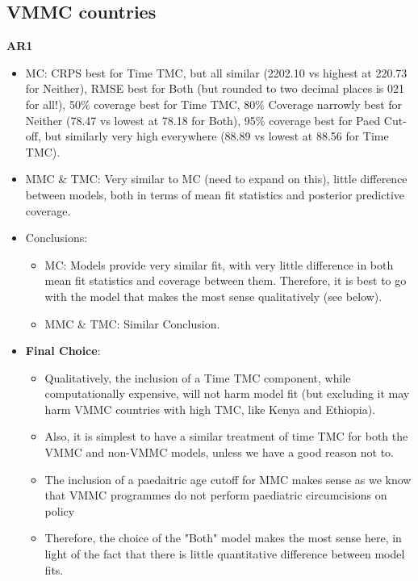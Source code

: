 \documentclass{article}
\begin{document}

\subsection{VMMC countries}
\label{sec:org09db5e8}

\textbf{AR1}

\begin{itemize}
    \item MC: CRPS best for Time TMC, but all similar (2202.10 vs highest at 220.73 for Neither), RMSE best for Both (but rounded to two decimal places is 021 for all!), 50\% coverage best for Time TMC, 80\% Coverage narrowly best for Neither (78.47 vs lowest at 78.18 for Both), 95\% coverage best for Paed Cut-off, but similarly very high everywhere (88.89 vs lowest at 88.56 for Time TMC). 
    \item MMC \& TMC: Very similar to MC (need to expand on this), little difference between models, both in terms of mean fit statistics and posterior predictive coverage.
    \item Conclusions: 
    \begin{itemize}
        \item MC: Models provide very similar fit, with very little difference in both mean fit statistics and coverage between them. Therefore, it is best to go with the model that makes the most sense qualitatively (see below).
        \item MMC & TMC: Similar Conclusion. 
    \end{itemize}
    \item \textbf{Final Choice}: 
    \begin{itemize}
      \item Qualitatively, the inclusion of a Time TMC component, while computationally expensive, will not harm model fit (but excluding it may harm VMMC countries with high TMC, like Kenya and Ethiopia).
      \item Also, it is simplest to have a similar treatment of time TMC for both the VMMC and non-VMMC models, unless we have a good reason not to.
      \item The inclusion of a paedaitric age cutoff for MMC makes sense as we know that VMMC programmes do not perform paediatric circumcisions on policy
      \item Therefore, the choice of the "Both" model makes the most sense here, in light of the fact that there is little quantitative difference between model fits. 
    \end{itemize}
\end{itemize}
\end{document}
